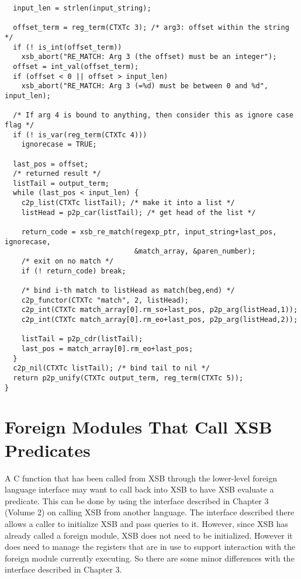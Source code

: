 {\begin{verbatim}
  input_len = strlen(input_string);
  
  offset_term = reg_term(CTXTc 3); /* arg3: offset within the string */
  if (! is_int(offset_term))
    xsb_abort("RE_MATCH: Arg 3 (the offset) must be an integer");
  offset = int_val(offset_term);
  if (offset < 0 || offset > input_len)
    xsb_abort("RE_MATCH: Arg 3 (=%d) must be between 0 and %d", input_len);

  /* If arg 4 is bound to anything, then consider this as ignore case flag */
  if (! is_var(reg_term(CTXTc 4)))
    ignorecase = TRUE;

  last_pos = offset;
  /* returned result */
  listTail = output_term;
  while (last_pos < input_len) {
    c2p_list(CTXTc listTail); /* make it into a list */
    listHead = p2p_car(listTail); /* get head of the list */

    return_code = xsb_re_match(regexp_ptr, input_string+last_pos, ignorecase,
                               &match_array, &paren_number);
    /* exit on no match */
    if (! return_code) break;

    /* bind i-th match to listHead as match(beg,end) */
    c2p_functor(CTXTc "match", 2, listHead);
    c2p_int(CTXTc match_array[0].rm_so+last_pos, p2p_arg(listHead,1));
    c2p_int(CTXTc match_array[0].rm_eo+last_pos, p2p_arg(listHead,2));

    listTail = p2p_cdr(listTail);
    last_pos = match_array[0].rm_eo+last_pos;
  }
  c2p_nil(CTXTc listTail); /* bind tail to nil */
  return p2p_unify(CTXTc output_term, reg_term(CTXTc 5));
}
\end{verbatim}
}

\section{Foreign Modules That Call XSB Predicates}

A C function that has been called from XSB through the lower-level
foreign language interface may want to call back into XSB to have XSB
evaluate a predicate.  This can be done by using the interface
described in Chapter 3 (Volume 2) on calling XSB from another
language.  The interface described there allows a caller to initialize
XSB and pass queries to it.  However, since XSB has already called a
foreign module, XSB does not need to be initialized.  However it does
need to manage the registers that are in use to support interaction
with the foreign module currently executing.  So there are some minor
differences with the interface described in Chapter 3.

